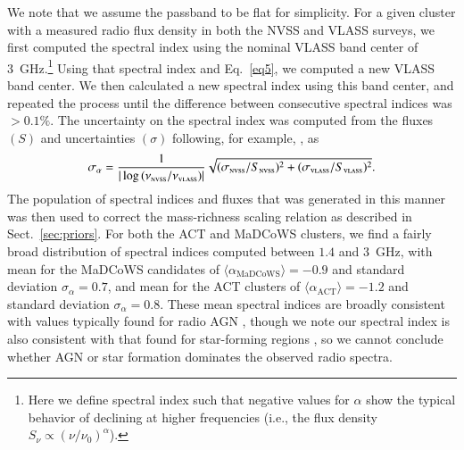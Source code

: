 \documentclass[longauth]{aa} %
\newcommand{\madcows}{MaDCoWS\xspace}
\begin{document}
%
We note that we assume the passband to be flat for simplicity. For a given cluster with a measured radio flux density in both the NVSS and VLASS surveys, we first computed the spectral index using the nominal VLASS band center of 3~GHz.\footnote{Here we define spectral index such that negative values for $\alpha$ show the typical behavior of declining at higher frequencies (i.e., the flux density $S_{\nu} \propto (\nu/\nu_0)^{\alpha}$).} Using that spectral index and Eq.~\ref{eq5}, we computed a new VLASS band center. We then calculated a new spectral index using this band center, and repeated the process until the difference between consecutive spectral indices was $>0.1\%$. The uncertainty on the spectral index was computed from the fluxes $(S)$ and uncertainties $(\sigma)$ following, for example, \cite{Zajacek2019}, as
\begin{equation}
    \sigma_{\alpha}=\frac{1}{|\log{(\nu_{\textsc{nvss}}/ \nu_{\textsc{vlass}})}|}\sqrt{(\sigma_{\textsc{nvss}}/S_{\textsc{nvss}})^2+(\sigma_{\textsc{vlass}}/S_{\textsc{vlass}})^2}.
\end{equation}
The population of spectral indices and fluxes that was generated in this manner was then used to correct the mass-richness scaling relation as described in Sect.~\ref{sec:priors}. For both the ACT and \madcows clusters, we find a fairly broad distribution of spectral indices computed between $1.4$ and $3$~GHz, with mean for the \madcows candidates of $\langle \alpha_\text{\madcows} \rangle = -0.9$ and standard deviation $\sigma_{\alpha} = 0.7$, and mean for the ACT clusters of $\langle \alpha_\text{ACT} \rangle = -1.2$ and standard deviation $\sigma_{\alpha} = 0.8$.
These mean spectral indices are broadly consistent with values typically found for radio AGN \citep{Coble2007,Sayers2013}, though we note our spectral index is also consistent with that found for star-forming regions \citep[typically $\alpha<-0.6$; see][]{CalistroRivera2017}, so we cannot conclude whether AGN or star formation dominates the observed radio spectra.\\
\end{document}
